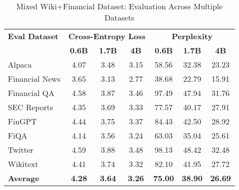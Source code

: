 
\begin{table}[htbp]
\centering
\caption[Mixed Wiki+Financial: Evaluation Results]{Mixed Wiki+Financial Dataset: Evaluation Across Multiple Datasets}
\label{tab:mixed_wiki_financial_results}
\begin{tabular}{l|ccc|ccc}
\hline
\textbf{Eval Dataset} & \multicolumn{3}{c|}{\textbf{Cross-Entropy Loss}} & \multicolumn{3}{c}{\textbf{Perplexity}} \\
\cline{2-4} \cline{5-7}
  & \textbf{0.6B} & \textbf{1.7B} & \textbf{4B} & \textbf{0.6B} & \textbf{1.7B} & \textbf{4B} \\
Alpaca & 4.07 & 3.48 & 3.15 & 58.56 & 32.38 & 23.23 \\
Financial News & 3.65 & 3.13 & 2.77 & 38.68 & 22.79 & 15.91 \\
Financial QA & 4.58 & 3.87 & 3.46 & 97.49 & 47.94 & 31.76 \\
SEC Reports & 4.35 & 3.69 & 3.33 & 77.57 & 40.17 & 27.91 \\
FinGPT & 4.44 & 3.75 & 3.37 & 84.43 & 42.50 & 28.92 \\
FiQA & 4.14 & 3.56 & 3.24 & 63.03 & 35.04 & 25.61 \\
Twitter & 4.59 & 3.88 & 3.48 & 98.13 & 48.42 & 32.48 \\
Wikitext & 4.41 & 3.74 & 3.32 & 82.10 & 41.95 & 27.72 \\
\hline
\textbf{Average} & \textbf{4.28} & \textbf{3.64} & \textbf{3.26} & \textbf{75.00} & \textbf{38.90} & \textbf{26.69} \\
\hline
\end{tabular}
\end{table}
